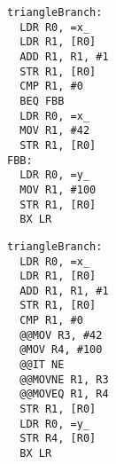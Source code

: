 \begin{center}
    \begin{minipage}{0.22\textwidth}
    \begin{lstlisting}[style=AsmStyle]
triangleBranch:
  LDR R0, =x_
  LDR R1, [R0]
  ADD R1, R1, #1
  STR R1, [R0]
  CMP R1, #0
  BEQ FBB
  LDR R0, =x_
  MOV R1, #42
  STR R1, [R0]
FBB:
  LDR R0, =y_
  MOV R1, #100
  STR R1, [R0]
  BX LR
    \end{lstlisting}
    \end{minipage}
    \hfill
    \begin{minipage}{0.22\textwidth}
    \end{minipage}
    \hfill
    \begin{minipage}{0.22\textwidth}
    \begin{lstlisting}[style=AsmStyle]
triangleBranch:
  LDR R0, =x_
  LDR R1, [R0]
  ADD R1, R1, #1
  STR R1, [R0]
  CMP R1, #0
  @@MOV R3, #42
  @MOV R4, #100
  @@IT NE
  @@MOVNE R1, R3
  @@MOVEQ R1, R4
  STR R1, [R0]
  LDR R0, =y_
  STR R4, [R0]
  BX LR
    \end{lstlisting}
    \end{minipage}
    \hfill
    \begin{minipage}{0.22\textwidth}
    \end{minipage}
    \end{center}